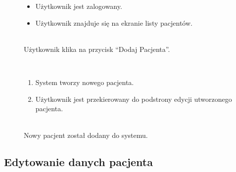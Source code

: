 \documentclass[11pt]{aghdpl}
\begin{document}
	\begin{description}
		\item[\useCaseAktor] \hfill \\
			\useCaseUzytkownik
		\item[\useCaseWarPocz] \hfill \\
			\begin{itemize}
				\item Użytkownik jest zalogowany.
				\item Użytkownik znajduje się na ekranie listy pacjentów.
			\end{itemize}
		\item[\useCaseZdarzInicj] \hfill \\
			Użytkownik klika na przycisk ``Dodaj Pacjenta''.
		\item[\useCaseScenBaz] \hfill \\ 
			\begin{enumerate}
				\item System tworzy nowego pacjenta.
				\item Użytkownik jest przekierowany do podstrony edycji utworzonego pacjenta.
			\end{enumerate}
		\item[\useCaseWarKonc] \hfill \\ 
			Nowy pacjent został dodany do systemu.
	\end{description}

\subsection{Edytowanie danych pacjenta}
\end{document}

